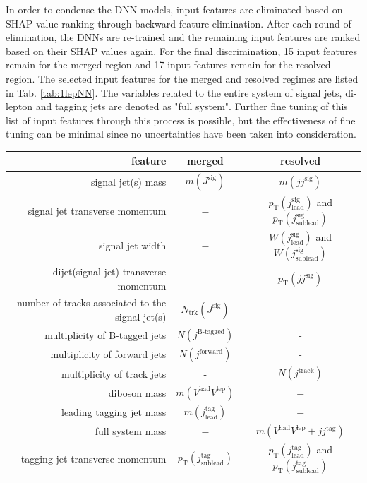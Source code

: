 In order to condense the DNN models, input features are eliminated based on SHAP value ranking through backward feature elimination. After each round of elimination, the DNNs are re-trained and the remaining input features are ranked based on their SHAP values again. For the final discrimination, 15 input features remain for the merged region and 17 input features remain for the resolved region. The selected input features for the merged and resolved regimes are listed in Tab. \ref{tab:1lepNN}. The variables related to the entire system of signal jets, di-lepton and tagging jets are denoted as "full system". Further fine tuning of this list of input features through this process is possible, but the effectiveness of fine tuning can be minimal since no uncertainties have been taken into consideration.

\begin{table}[ht]
    \centering
    \begin{tabular}{r|c|c}
     feature & merged & resolved\\
     \hline
     \hline
     signal jet(s) mass & $m(J^\text{sig})$ & $m(jj^\text{sig})$\\
     signal jet transverse momentum & $ - $ & $p_\text{T}(j^\text{sig}_\text{lead})$ and  $p_\text{T}(j^\text{sig}_\text{sublead})$\\
     signal jet width & $ - $ & $W(j^\text{sig}_\text{lead})$ and  $W(j^\text{sig}_\text{sublead})$\\
     dijet(signal jet) transverse momentum & $ - $ & $p_\text{T}(jj^\text{sig})$\\
     number of tracks associated to the signal jet(s) & $N_\text{trk}(J^\text{sig})$ & -\\
     multiplicity of B-tagged jets & $N(j^\text{B-tagged})$ & -\\
     multiplicity of forward jets & $N(j^\text{forward})$ & -\\
     multiplicity of track jets & - & $N(j^\text{track})$\\
     diboson mass & $m(V^\text{had}V^\text{lep})$ & $ - $\\
     leading tagging jet mass & $m(j^\text{tag}_\text{lead})$ & $ - $\\
     full system mass & $ - $ & $m(V^\text{had}V^\text{lep}+jj^\text{tag})$\\
     tagging jet transverse momentum & $p_\text{T}(j^\text{tag}_\text{sublead})$ & $p_\text{T}(j^\text{tag}_\text{lead})$ and $p_\text{T}(j^\text{tag}_\text{sublead})$\\

\end{tabular}
\end{table}
